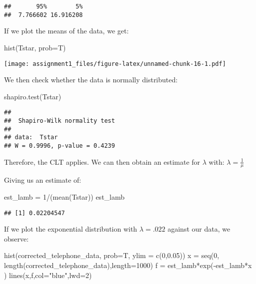\documentclass[
]{article}
\newenvironment{Shaded}{\begin{snugshade}}{\end{snugshade}}
\newcommand{\AttributeTok}[1]{\textcolor[rgb]{0.77,0.63,0.00}{#1}}
\newcommand{\DecValTok}[1]{\textcolor[rgb]{0.00,0.00,0.81}{#1}}
\newcommand{\FloatTok}[1]{\textcolor[rgb]{0.00,0.00,0.81}{#1}}
\newcommand{\FunctionTok}[1]{\textcolor[rgb]{0.00,0.00,0.00}{#1}}
\newcommand{\NormalTok}[1]{#1}
\newcommand{\OtherTok}[1]{\textcolor[rgb]{0.56,0.35,0.01}{#1}}
\newcommand{\SpecialCharTok}[1]{\textcolor[rgb]{0.00,0.00,0.00}{#1}}
\newcommand{\StringTok}[1]{\textcolor[rgb]{0.31,0.60,0.02}{#1}}
\begin{document}
\begin{verbatim}
##       95%        5% 
##  7.766602 16.916208
\end{verbatim}

If we plot the means of the data, we get:

\begin{Shaded}
\begin{Highlighting}[]
\FunctionTok{hist}\NormalTok{(Tstar, }\AttributeTok{prob=}\NormalTok{T)}
\end{Highlighting}
\end{Shaded}

\texttt{[image: assignment1\_files/figure-latex/unnamed-chunk-16-1.pdf]}

We then check whether the data is normally distributed:

\begin{Shaded}
\begin{Highlighting}[]
\FunctionTok{shapiro.test}\NormalTok{(Tstar)}
\end{Highlighting}
\end{Shaded}

\begin{verbatim}
## 
##  Shapiro-Wilk normality test
## 
## data:  Tstar
## W = 0.9996, p-value = 0.4239
\end{verbatim}

Therefore, the CLT applies. We can then obtain an estimate for
\(\lambda\) with: \(\lambda = \frac{1}{\mu}\)

Giving us an estimate of:

\begin{Shaded}
\begin{Highlighting}[]
\NormalTok{est\_lamb }\OtherTok{=} \DecValTok{1}\SpecialCharTok{/}\NormalTok{(}\FunctionTok{mean}\NormalTok{(Tstar))}
\NormalTok{est\_lamb}
\end{Highlighting}
\end{Shaded}

\begin{verbatim}
## [1] 0.02204547
\end{verbatim}

If we plot the exponential distribution with \(\lambda = .022\) against
our data, we observe:

\begin{Shaded}
\begin{Highlighting}[]
\FunctionTok{hist}\NormalTok{(corrected\_telephone\_data, }\AttributeTok{prob=}\NormalTok{T, }\AttributeTok{ylim =} \FunctionTok{c}\NormalTok{(}\DecValTok{0}\NormalTok{,}\FloatTok{0.05}\NormalTok{))}
\NormalTok{x }\OtherTok{=} \FunctionTok{seq}\NormalTok{(}\DecValTok{0}\NormalTok{, }\FunctionTok{length}\NormalTok{(corrected\_telephone\_data),}\AttributeTok{length=}\DecValTok{1000}\NormalTok{)}
\NormalTok{f }\OtherTok{=}\NormalTok{ est\_lamb}\SpecialCharTok{*}\FunctionTok{exp}\NormalTok{(}\SpecialCharTok{{-}}\NormalTok{est\_lamb}\SpecialCharTok{*}\NormalTok{x )}
\FunctionTok{lines}\NormalTok{(x,f,}\AttributeTok{col=}\StringTok{"blue"}\NormalTok{,}\AttributeTok{lwd=}\DecValTok{2}\NormalTok{)}
\end{Highlighting}
\end{Shaded}
\end{document}
